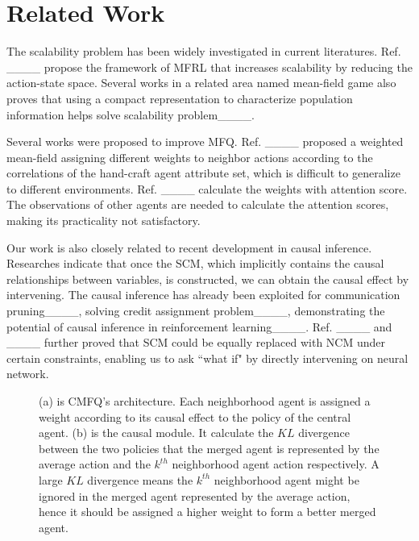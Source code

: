 \section{Related Work}
The scalability problem has been widely investigated in current literatures. Ref. ____ propose the framework of MFRL that increases scalability by reducing the action-state space. Several works in a related area named mean-field game also proves that using a compact representation to characterize population information helps solve scalability problem____.


Several works were proposed to improve MFQ. Ref. ____ proposed a weighted mean-field assigning different weights to neighbor actions according to the correlations of the hand-craft agent attribute set, which is difficult to generalize to different environments. Ref. ____ calculate the weights with attention score. The observations of other agents are needed to calculate the attention scores, making its practicality not satisfactory. 


Our work is also closely related to recent development in causal inference. Researches indicate that once the SCM, which implicitly contains the causal relationships between variables, is constructed, we can obtain the causal effect by intervening. The causal inference has already been exploited for communication pruning____, solving credit assignment problem____, demonstrating the potential of causal inference in reinforcement learning____. Ref. ____ and ____ further proved that SCM could be equally replaced with NCM under certain constraints, enabling us to ask ``what if" by directly intervening on neural network.



\begin{figure}
\setlength{\abovedisplayskip}{1.5pt}
\setlength{\belowdisplayskip}{3pt}
    \centering
    \hspace{0.15in}
    \caption{(a) is CMFQ's architecture. Each neighborhood agent is assigned a weight according to its causal effect to the policy of the central agent. (b) is the causal module. It calculate the $KL$ divergence between the two policies that the merged agent is represented by the average action and the $k^{th}$ neighborhood agent action respectively. A large $KL$ divergence means the $k^{th}$ neighborhood agent might be ignored in the merged agent represented by the average action, hence it should be assigned a higher weight to form a better merged agent.}
    \label{fig:frame&causal_module}
\end{figure}